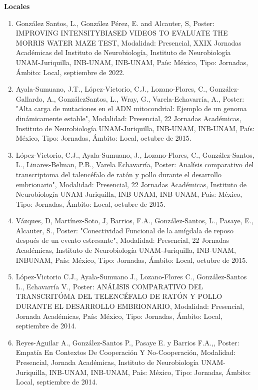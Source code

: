 \textbf{Locales}

\hfill

\begin{enumerate}

\item  González Santos, L., González Pérez, E. and Alcauter, S, Poster: IMPROVING INTENSITYBIASED VIDEOS TO EVALUATE THE MORRIS 
WATER MAZE TEST, Modalidad: Presencial, XXIX Jornadas Académicas del Instituto de Neurobiología, Instituto de Neurobiología 
UNAM-Juriquilla, INB-UNAM, INB-UNAM, País: México, Tipo: Jornadas, Ámbito: Local, septiembre de 2022.

\item  Ayala-Sumuano, J.T., López-Victorio, C.J., Lozano-Flores, C., González-Gallardo, A., GonzálezSantos, L., Wray, G., 
Varela-Echavarría, A., Poster: "Alta carga de mutaciones en el ADN mitocondrial: Ejemplo de un genoma dinámicamente 
estable", Modalidad: Presencial, 22 Jornadas Académicas, Instituto de Neurobiología UNAM-Juriquilla, INB-UNAM, INB-UNAM, 
País: México, Tipo: Jornadas, Ámbito: Local, octubre de 2015.


\item  López-Victorio, C.J., Ayala-Sumuano, J., Lozano-Flores, C., González-Santos, L., Linares-Belman, P.B., 
Varela Echavarría, Poster: Analísis comparativo del transcriptoma del talencéfalo de ratón y pollo durante el desarrollo 
embrionario", Modalidad: Presencial, 22 Jornadas Académicas, Instituto de Neurobiología UNAM-Juriquilla, INB-UNAM, 
INB-UNAM, País: México, Tipo: Jornadas, Ámbito: Local, octubre de 2015.

\item  Vázques, D, Martínez-Soto, J, Barrios, F.A., González-Santos, L., Pasaye, E., Alcauter, S., Poster: "Conectividad 
Funcional de la amígdala de reposo después de un evento estresante", Modalidad: Presencial, 22 Jornadas Académicas, 
Instituto de Neurobiología UNAM-Juriquilla, INB-UNAM, INBUNAM, País: México, Tipo: Jornadas, Ámbito: Local, octubre de 
2015.

\item  López-Victorio C.J., Ayala-Sumuano J., Lozano-Flores C., González-Santos L., Echavarría V., Poster: ANÁLISIS COMPARATIVO 
DEL TRANSCRITÓMA DEL TELENCÉFALO DE RATÓN Y POLLO DURANTE EL DESARROLLO EMBRIONARIO, Modalidad: Presencial, Jornada 
Académicas, País: México, Tipo: Jornadas, Ámbito: Local, septiembre de 2014.

\item  Reyes-Aguilar A., González-Santos P., Pasaye E. y Barrios F.A.,, Poster: Empatía En Contextos De Cooperación Y 
No-Cooperación, Modalidad: Presencial, Jornada Académicas, Instituto de Neurobiología UNAM-Juriquilla, INB-UNAM, INB-UNAM, 
País: México, Tipo: Jornadas, Ámbito: Local, septiembre de 2014.


\end{enumerate}

